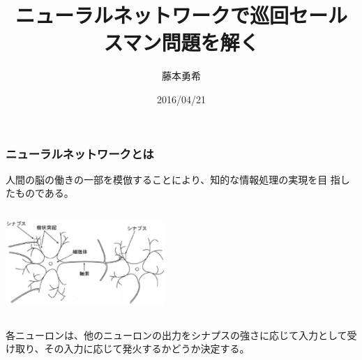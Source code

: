 \documentclass[dvipdfmx,11pt,notheorems]{beamer}
\title[タイトル]{ニューラルネットワークで巡回セールスマン問題を解く}
\institute[JPN]{名古屋大学多元数理科学研究科}
\author[]{藤本勇希}
\date{2016/04/21}
\theoremstyle{definition}
\begin{document}
\begin{frame}[plain]\frametitle{}
\titlepage %
\end{frame}



\begin{frame}\frametitle{ニューラルネットワークとは}
人間の脳の働きの一部を模倣することにより、知的な情報処理の実現を目
指したものである。
\begin{center}
\includegraphics[width=6cm, height=4cm]{neuron.eps}
\end{center}
各ニューロンは、他のニューロンの出力をシナプスの強さに応じて入力として受け取り、その入力に応じて発火するかどうか決定する。
\end{frame}
\end{document}
